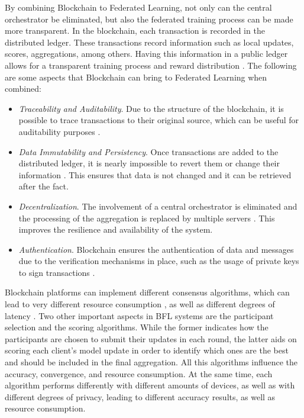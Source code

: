 By combining Blockchain to Federated Learning, not only can the central orchestrator be eliminated, but also the federated training process can be made more transparent. In the blockchain, each transaction is recorded in the distributed ledger. These transactions record information such as local updates, scores, aggregations, among others. Having this information in a public ledger allows for a transparent training process and reward distribution \cite{li_blockchain_2021}. The following are some aspects that Blockchain can bring to Federated Learning when combined:

\begin{itemize}
    \item \textit{Traceability and Auditability}. Due to the structure of the blockchain, it is possible to trace transactions to their original source, which can be useful for auditability purposes \cite{10.48550/arxiv.1902.01046, 10.48550/arxiv.2110.02182}.
    
    \item \textit{Data Immutability and Persistency}. Once transactions are added to the distributed ledger, it is nearly impossible to revert them or change their information \cite{10.48550/arxiv.1902.01046, qu_blockchain-enabled_2022}. This ensures that data is not changed and it can be retrieved after the fact.
    
    \item \textit{Decentralization}. The involvement of a central orchestrator is eliminated and the processing of the aggregation is replaced by multiple servers \cite{10.48550/arxiv.2009.09338, 9403374, 10.48550/arxiv.2110.02182, qu_blockchain-enabled_2022}. This improves the resilience and availability of the system.
    
    \item \textit{Authentication}. Blockchain ensures the authentication of data and messages due to the verification mechanisms in place, such as the usage of private keys to sign transactions \cite{qu_blockchain-enabled_2022}.
\end{itemize}

Blockchain platforms can implement different consensus algorithms, which can lead to very different resource consumption \cite{ccaf}, as well as different degrees of latency \cite{Alqahtani_2021}. Two other important aspects in BFL systems are the participant selection and the scoring algorithms. While the former indicates how the participants are chosen to submit their updates in each round, the latter aids on scoring each client's model update in order to identify which ones are the best and should be included in the final aggregation. All this algorithms influence the accuracy, convergence, and resource consumption. At the same time, each algorithm performs differently with different amounts of devices, as well as with different degrees of privacy, leading to different accuracy results, as well as resource consumption.


